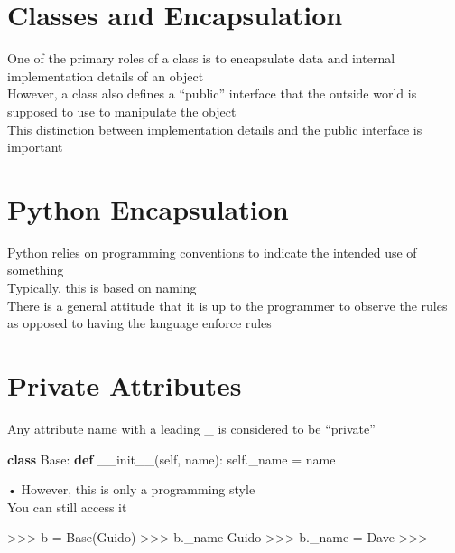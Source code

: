 \documentclass[
  letterpaper,
  DIV=11,
  numbers=noendperiod]{scrreprt}
\newenvironment{Shaded}{\begin{snugshade}}{\end{snugshade}}
\newcommand{\FunctionTok}[1]{\textcolor[rgb]{0.28,0.35,0.67}{#1}}
\newcommand{\KeywordTok}[1]{\textcolor[rgb]{0.00,0.23,0.31}{\textbf{#1}}}
\newcommand{\NormalTok}[1]{\textcolor[rgb]{0.00,0.23,0.31}{#1}}
\newcommand{\OperatorTok}[1]{\textcolor[rgb]{0.37,0.37,0.37}{#1}}
\newcommand{\VariableTok}[1]{\textcolor[rgb]{0.07,0.07,0.07}{#1}}
\begin{document}

\chapter{Classes and Encapsulation}\label{classes-and-encapsulation}

One of the primary roles of a class is to encapsulate data and internal
implementation details of an object\\
However, a class also defines a ``public'' interface that the outside
world is supposed to use to manipulate the object\\
This distinction between implementation details and the public interface
is important


\chapter{Python Encapsulation}\label{python-encapsulation}

Python relies on programming conventions to indicate the intended use of
something\\
Typically, this is based on naming\\
There is a general attitude that it is up to the programmer to observe
the rules as opposed to having the language enforce rules


\chapter{Private Attributes}\label{private-attributes}

Any attribute name with a leading \_ is considered to be ``private''

\begin{Shaded}
\begin{Highlighting}[]
\KeywordTok{class}\NormalTok{ Base: }\KeywordTok{def} \FunctionTok{\_\_init\_\_}\NormalTok{(}\VariableTok{self}\NormalTok{, name): }\VariableTok{self}\NormalTok{.\_name }\OperatorTok{=}\NormalTok{ name }
\end{Highlighting}
\end{Shaded}

• However, this is only a programming style\\
You can still access it

\begin{Shaded}
\begin{Highlighting}[]
\NormalTok{\textgreater{}\textgreater{}\textgreater{} b = Base(\textquotesingle{}Guido\textquotesingle{})}
\NormalTok{\textgreater{}\textgreater{}\textgreater{} b.\_name}
\NormalTok{\textquotesingle{}Guido\textquotesingle{}}
\NormalTok{\textgreater{}\textgreater{}\textgreater{} b.\_name = \textquotesingle{}Dave\textquotesingle{}}
\NormalTok{\textgreater{}\textgreater{}\textgreater{} }
\end{Highlighting}
\end{Shaded}
\end{document}
